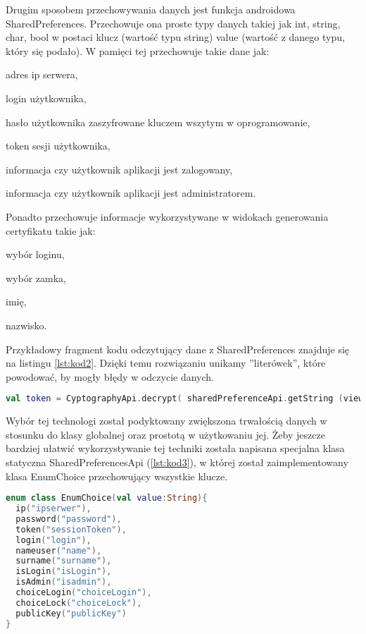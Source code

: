 	Drugim sposobem przechowywania danych jest funkcja androidowa SharedPreferences. Przechowuje ona proste typy danych takiej jak int, string, char, bool w postaci klucz (wartość typu string) value (wartość z danego typu, który się podało). W pamięci tej przechowuje takie dane jak:
	\begin{itemize*}
		\item adres ip serwera,
		\item login użytkownika,
		\item hasło użytkownika zaszyfrowane kluczem wszytym w oprogramowanie,
		\item token sesji użytkownika,
		\item informacja czy użytkownik aplikacji jest zalogowany,
		\item informacja czy użytkownik aplikacji jest administratorem.	
	\end{itemize*}

	Ponadto przechowuje informacje wykorzystywane w widokach generowania certyfikatu takie jak:
	\begin{itemize*}
		\item wybór loginu,
		\item wybór zamka,
		\item imię, 
		\item nazwisko.
	\end{itemize*}	

	Przykładowy fragment kodu odczytujący dane z SharedPreferences znajduje się na listingu \ref{lst:kod2}. Dzięki temu rozwiązaniu unikamy ''literówek'', które powodować, by mogły błędy w odczycie danych. 
		
	\begin{lstlisting}[caption={Fragment kodu odpowiedzialny za odczytanie tokenu}, label={lst:kod2}, language=Kotlin]
val token = CyptographyApi.decrypt( sharedPreferenceApi.getString (view, EnumChoice.token))
	\end{lstlisting}
	
	Wybór tej technologi został podyktowany zwiększona trwałością danych w stosunku do klasy globalnej oraz prostotą w użytkowaniu jej. Żeby jeszcze bardziej ułatwić wykorzystywanie tej techniki została napisana specjalna klasa statyczna SharedPreferencesApi (\ref{lst:kod3}), w której został zaimplementowany klasa EnumChoice przechowujący wszystkie klucze.
	
		\begin{lstlisting}[caption={klasa EnumChoice.}, label={lst:kod3}, language=Kotlin]
enum class EnumChoice(val value:String){
  ip("ipserwer"),
  password("password"),
  token("sessionToken"),
  login("login"), 
  nameuser("name"), 
  surname("surname"),
  isLogin("isLogin"), 
  isAdmin("isadmin"),
  choiceLogin("choiceLogin"), 
  choiceLock("choiceLock"),
  publicKey("publicKey")
}
		\end{lstlisting}
		
